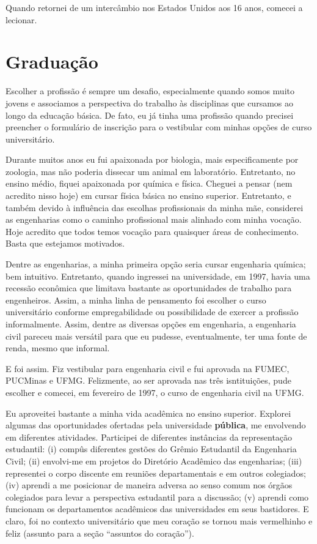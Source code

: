 \documentclass[
]{book}
\begin{document}
Quando retornei de um intercâmbio nos Estados Unidos aos 16 anos,
comecei a lecionar.

\hypertarget{graduauxe7uxe3o}{%
\section{Graduação}\label{graduauxe7uxe3o}}

Escolher a profissão é sempre um desafio, especialmente quando somos
muito jovens e associamos a perspectiva do trabalho às disciplinas que
cursamos ao longo da educação básica. De fato, eu já tinha uma profissão
quando precisei preencher o formulário de inscrição para o vestibular
com minhas opções de curso universitário.

Durante muitos anos eu fui apaixonada por biologia, mais especificamente
por zoologia, mas não poderia dissecar um animal em laboratório.
Entretanto, no ensino médio, fiquei apaixonada por química e física.
Cheguei a pensar (nem acredito nisso hoje) em cursar física básica no
ensino superior. Entretanto, e também devido à influência das escolhas
profissionais da minha mãe, considerei as engenharias como o caminho
profissional mais alinhado com minha vocação. Hoje acredito que todos
temos vocação para quaisquer áreas de conhecimento. Basta que estejamos
motivados.

Dentre as engenharias, a minha primeira opção seria cursar engenharia
química; bem intuitivo. Entretanto, quando ingressei na universidade, em
1997, havia uma recessão econômica que limitava bastante as
oportunidades de trabalho para engenheiros. Assim, a minha linha de
pensamento foi escolher o curso universitário conforme empregabilidade
ou possibilidade de exercer a profissão informalmente. Assim, dentre as
diversas opções em engenharia, a engenharia civil pareceu mais versátil
para que eu pudesse, eventualmente, ter uma fonte de renda, mesmo que
informal.

E foi assim. Fiz vestibular para engenharia civil e fui aprovada na
FUMEC, PUCMinas e UFMG. Felizmente, ao ser aprovada nas três
isntituições, pude escolher e comecei, em fevereiro de 1997, o curso de
engenharia civil na UFMG.

Eu aproveitei bastante a minha vida acadêmica no ensino superior.
Explorei algumas das oportunidades ofertadas pela universidade
\textbf{pública}, me envolvendo em diferentes atividades. Participei de
diferentes instâncias da representação estudantil: (i) compûs diferentes
gestões do Grêmio Estudantil da Engenharia Civil; (ii) envolvi-me em
projetos do Diretório Acadêmico das engenharias; (iii) representei o
corpo discente em reuniões departamentais e em outros colegiados; (iv)
aprendi a me posicionar de maneira adversa ao senso comum nos órgãos
colegiados para levar a perspectiva estudantil para a discussão; (v)
aprendi como funcionam os departamentos acadêmicos das universidades em
seus bastidores. E claro, foi no contexto universitário que meu coração
se tornou mais vermelhinho e feliz (assunto para a seção ``assuntos do
coração'').
\end{document}
